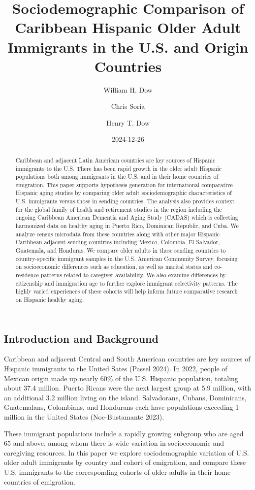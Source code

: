\documentclass[
]{article}
\title{Sociodemographic Comparison of Caribbean Hispanic Older Adult
Immigrants in the U.S. and Origin Countries}
\author{William H. Dow \and Chris Soria \and Henry T. Dow}
\date{2024-12-26}
\begin{document}
\maketitle
\begin{abstract}
Caribbean and adjacent Latin American countries are key sources of
Hispanic immigrants to the U.S. There has been rapid growth in the older
adult Hispanic populations both among immigrants in the U.S. and in
their home countries of emigration. This paper supports hypothesis
generation for international comparative Hispanic aging studies by
comparing older adult sociodemographic characteristics of U.S.
immigrants versus those in sending countries. The analysis also provides
context for the global family of health and retirement studies in the
region including the ongoing Caribbean American Dementia and Aging Study
(CADAS) which is collecting harmonized data on healthy aging in Puerto
Rico, Dominican Republic, and Cuba. We analyze census microdata from
these countries along with other major Hispanic Caribbean-adjacent
sending countries including Mexico, Colombia, El Salvador, Guatemala,
and Honduras. We compare older adults in these sending countries to
country-specific immigrant samples in the U.S. American Community
Survey, focusing on socioeconomic differences such as education, as well
as marital status and co-residence patterns related to caregiver
availability. We also examine differences by citizenship and immigration
age to further explore immigrant selectivity patterns. The highly varied
experiences of these cohorts will help inform future comparative
research on Hispanic healthy aging.
\end{abstract}


\subsection{Introduction and Background}\label{sec-intro}

Caribbean and adjacent Central and South American countries are key
sources of Hispanic immigrants to the United Sates (Passel 2024). In
2022, people of Mexican origin made up nearly 60\% of the U.S. Hispanic
population, totaling about 37.4 million. Puerto Ricans were the next
largest group at 5.9 million, with an additional 3.2 million living on
the island. Salvadorans, Cubans, Dominicans, Guatemalans, Colombians,
and Hondurans each have populations exceeding 1 million in the United
States (Noe-Bustamante 2023).

These immigrant populations include a rapidly growing subgroup who are
aged 65 and above, among whom there is wide variation in socioeconomic
and caregiving resources. In this paper we explore sociodemographic
variation of U.S. older adult immigrants by country and cohort of
emigration, and compare these U.S. immigrants to the corresponding
cohorts of older adults in their home countries of emigration.
\end{document}
